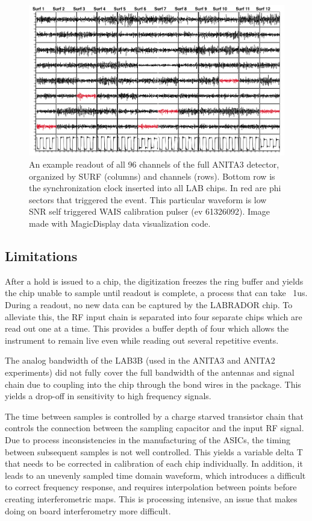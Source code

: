 \begin{figure}
\centering
	\includegraphics[width=\textwidth]{figures/waveformSnapshot}
	\caption{An example readout of all 96 channels of the full ANITA3 detector, organized by SURF (columns) and channels (rows).  Bottom row is the synchronization clock inserted into all LAB chips.  In red are phi sectors that triggered the event.  This particular waveform is low SNR self triggered WAIS calibration pulser (ev 61326092).  Image made with MagicDisplay data visualization code.}
	\label{fig:waveformSnapshot}
\end{figure}
		
	
	
	\subsection{Limitations}
	After a hold is issued to a chip, the digitization freezes the ring buffer and yields the chip unable to sample until readout is complete, a process that can take ~1us.  During a readout, no new data can be captured by the LABRADOR chip.  To alleviate this, the RF input chain is separated into four separate chips which are read out one at a time.  This provides a buffer depth of four which allows the instrument to remain live even while reading out several repetitive events.
	
	The analog bandwidth of the LAB3B (used in the ANITA3 and ANITA2 experiments) did not fully cover the full bandwidth of the antennas and signal chain due to coupling into the chip through the bond wires in the package.  This yields a drop-off in sensitivity to high frequency signals.  
	
	The time between samples is controlled by a charge starved transistor chain that controls the connection between the sampling capacitor and the input RF signal.  Due to process inconsistencies in the manufacturing of the ASICs, the timing between subsequent samples is not well controlled.  This yields a variable delta T that needs to be corrected in calibration of each chip individually.  In addition, it leads to an unevenly sampled time domain waveform, which introduces a difficult to correct frequency response, and requires interpolation between points before creating interferometric maps.  This is processing intensive, an issue that makes doing on board interferometry more difficult.
	
